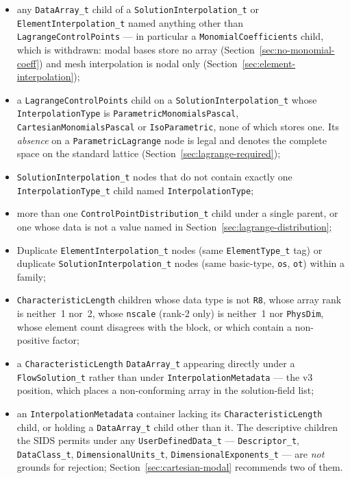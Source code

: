 \documentclass[11pt,letterpaper]{article}
\newif\ifvfourdraft
\newcommand{\vfour}[1]{\ifvfourdraft\textcolor{v4violet}{#1}\else#1\fi}
\begin{document}
\begin{itemize}
{    order of these very points;}
  \item \vfour{any \texttt{DataArray\_t} child of a \texttt{SolutionInterpolation\_t}
    or \texttt{ElementInterpolation\_t} named anything other than
    \texttt{LagrangeControlPoints} --- in particular a \texttt{MonomialCoefficients}
    child, which is withdrawn: modal bases store no array
    (Section~\ref{sec:no-monomial-coeff}) and mesh interpolation is nodal only
    (Section~\ref{sec:element-interpolation});}
  \item \vfour{a \texttt{LagrangeControlPoints} child on a
    \texttt{SolutionInterpolation\_t} whose \texttt{InterpolationType} is
    \texttt{ParametricMonomialsPascal}, \texttt{CartesianMonomialsPascal} or
    \texttt{IsoParametric}, none of which stores one.  Its \emph{absence} on a
    \texttt{ParametricLagrange} node is legal and denotes the complete space on
    the standard lattice (Section~\ref{sec:lagrange-required});}
  \item \texttt{SolutionInterpolation\_t} nodes that do not contain exactly one
    \texttt{InterpolationType\_t} child named \texttt{InterpolationType};
  \item more than one \texttt{ControlPointDistribution\_t} child under a single
    parent, or one whose data is not a value named in
    Section~\ref{sec:lagrange-distribution};
  \item Duplicate \texttt{ElementInterpolation\_t} nodes (same \texttt{ElementType\_t} tag) or
    duplicate \texttt{SolutionInterpolation\_t} nodes (same basic-type, \texttt{os},
    \texttt{ot}) within a family;
  \item \texttt{CharacteristicLength} children whose data type is not \texttt{R8}, whose
    array rank is neither~1 nor~2, whose \texttt{nscale} (rank-2 only) is neither~1 nor
    \texttt{PhysDim}, whose element count disagrees with the block, or which contain a
    non-positive factor;
  \item \vfour{a \texttt{CharacteristicLength} \texttt{DataArray\_t} appearing directly
    under a \texttt{FlowSolution\_t} rather than under
    \texttt{InterpolationMetadata} --- the v3 position, which places a
    non-conforming array in the solution-field list;}
  \item \vfour{an \texttt{InterpolationMetadata} container lacking its
    \texttt{CharacteristicLength} child, or holding a \texttt{DataArray\_t} child
    other than it.  The descriptive children the SIDS permits under any
    \texttt{UserDefinedData\_t} --- \texttt{Descriptor\_t}, \texttt{DataClass\_t},
    \texttt{DimensionalUnits\_t}, \texttt{DimensionalExponents\_t} --- are
    \emph{not} grounds for rejection; Section~\ref{sec:cartesian-modal} recommends
    two of them.}
\end{itemize}
\end{document}

